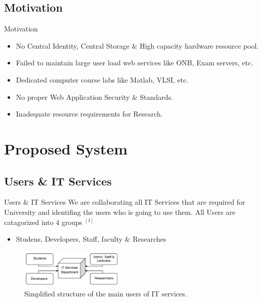 \documentclass[xcolor=dvipsnames]{beamer}
\begin{document}
\subsection{Motivation}
\begin{frame}{Motivation}

\begin{itemize}
	\item No Central Identity, Central Storage \& High capacity hardware resource pool.
	\item Failed to maintain large user load web services like ONB, Exam servers, etc.
	\item Dedicated computer course labs like Matlab, VLSI, etc.
	\item No proper Web Application Security \& Standards.
	\item Inadequate resource requirements for Research.
\end{itemize}

\end{frame}



\section{Proposed System}
\subsection{Users \& IT Services}
\begin{frame}{Users \& IT Services}
We are collaborating all IT Services that are required for University and identifing the users who is going to use them. All Users are catagorized into 4 groups $ ^{[1]}$
	
	\begin{itemize}
	\item Studens, Developers, Staff, faculty \& Researches
	\end{itemize}
\begin{figure}[H]
\begin{center}
\includegraphics[width=5cm]{./it.png}
\caption{ Simplified structure of the main users of IT services. \label{fig:Simplified structure of the main users of IT services. }}
\end{center}
\end{figure}
	
\end{frame}
\end{document}
